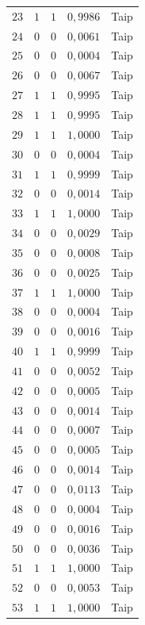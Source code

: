 \begin{longtable}{ccccc}
    $23$ & $1$ & $1$ & $0{,}9986$ & Taip \\
    $24$ & $0$ & $0$ & $0{,}0061$ & Taip \\
    $25$ & $0$ & $0$ & $0{,}0004$ & Taip \\
    $26$ & $0$ & $0$ & $0{,}0067$ & Taip \\
    $27$ & $1$ & $1$ & $0{,}9995$ & Taip \\
    $28$ & $1$ & $1$ & $0{,}9995$ & Taip \\
    $29$ & $1$ & $1$ & $1{,}0000$ & Taip \\
    $30$ & $0$ & $0$ & $0{,}0004$ & Taip \\
    $31$ & $1$ & $1$ & $0{,}9999$ & Taip \\
    $32$ & $0$ & $0$ & $0{,}0014$ & Taip \\
    $33$ & $1$ & $1$ & $1{,}0000$ & Taip \\
    $34$ & $0$ & $0$ & $0{,}0029$ & Taip \\
    $35$ & $0$ & $0$ & $0{,}0008$ & Taip \\
    $36$ & $0$ & $0$ & $0{,}0025$ & Taip \\
    $37$ & $1$ & $1$ & $1{,}0000$ & Taip \\
    $38$ & $0$ & $0$ & $0{,}0004$ & Taip \\
    $39$ & $0$ & $0$ & $0{,}0016$ & Taip \\
    $40$ & $1$ & $1$ & $0{,}9999$ & Taip \\
    $41$ & $0$ & $0$ & $0{,}0052$ & Taip \\
    $42$ & $0$ & $0$ & $0{,}0005$ & Taip \\
    $43$ & $0$ & $0$ & $0{,}0014$ & Taip \\
    $44$ & $0$ & $0$ & $0{,}0007$ & Taip \\
    $45$ & $0$ & $0$ & $0{,}0005$ & Taip \\
    $46$ & $0$ & $0$ & $0{,}0014$ & Taip \\
    $47$ & $0$ & $0$ & $0{,}0113$ & Taip \\
    $48$ & $0$ & $0$ & $0{,}0004$ & Taip \\
    $49$ & $0$ & $0$ & $0{,}0016$ & Taip \\
    $50$ & $0$ & $0$ & $0{,}0036$ & Taip \\
    $51$ & $1$ & $1$ & $1{,}0000$ & Taip \\
    $52$ & $0$ & $0$ & $0{,}0053$ & Taip \\
    $53$ & $1$ & $1$ & $1{,}0000$ & Taip \\

\end{longtable}
